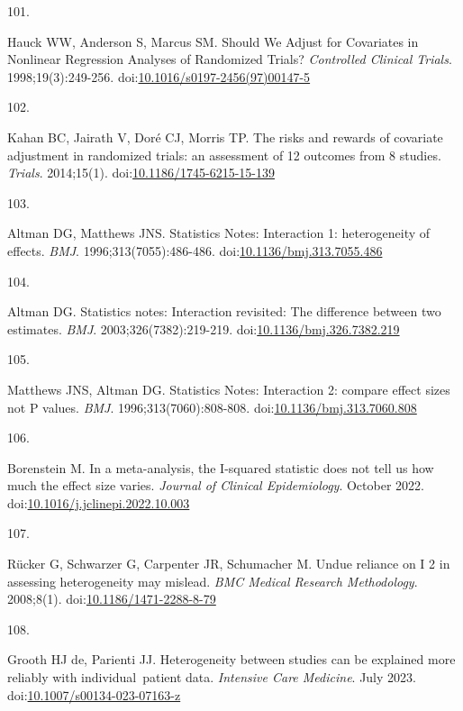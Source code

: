 \documentclass[
]{book}
\newlength{\cslhangindent}
\newlength{\csllabelwidth}
\newlength{\cslentryspacingunit} %
\newenvironment{CSLReferences}[2] %
 {%
  \setlength{\parindent}{0pt}
  \ifodd #1
  \let\oldpar\par
  \def\par{\hangindent=\cslhangindent\oldpar}
  \fi
  \setlength{\parskip}{#2\cslentryspacingunit}
 }%
 {}
\newcommand{\CSLLeftMargin}[1]{\parbox[t]{\csllabelwidth}{#1}}
\newcommand{\CSLRightInline}[1]{\parbox[t]{\linewidth - \csllabelwidth}{#1}\break}
\begin{document}
\begin{CSLReferences}{0}{0}
\leavevmode{}%
\CSLLeftMargin{101. }%
\CSLRightInline{Hauck WW, Anderson S, Marcus SM. Should We Adjust for Covariates in Nonlinear Regression Analyses of Randomized Trials? \emph{Controlled Clinical Trials}. 1998;19(3):249-256. doi:\href{https://doi.org/10.1016/s0197-2456(97)00147-5}{10.1016/s0197-2456(97)00147-5}}

\leavevmode{}%
\CSLLeftMargin{102. }%
\CSLRightInline{Kahan BC, Jairath V, Doré CJ, Morris TP. The risks and rewards of covariate adjustment in randomized trials: an assessment of 12 outcomes from 8 studies. \emph{Trials}. 2014;15(1). doi:\href{https://doi.org/10.1186/1745-6215-15-139}{10.1186/1745-6215-15-139}}

\leavevmode{}%
\CSLLeftMargin{103. }%
\CSLRightInline{Altman DG, Matthews JNS. Statistics Notes: Interaction 1: heterogeneity of effects. \emph{BMJ}. 1996;313(7055):486-486. doi:\href{https://doi.org/10.1136/bmj.313.7055.486}{10.1136/bmj.313.7055.486}}

\leavevmode{}%
\CSLLeftMargin{104. }%
\CSLRightInline{Altman DG. Statistics notes: Interaction revisited: The difference between two estimates. \emph{BMJ}. 2003;326(7382):219-219. doi:\href{https://doi.org/10.1136/bmj.326.7382.219}{10.1136/bmj.326.7382.219}}

\leavevmode{}%
\CSLLeftMargin{105. }%
\CSLRightInline{Matthews JNS, Altman DG. Statistics Notes: Interaction 2: compare effect sizes not P values. \emph{BMJ}. 1996;313(7060):808-808. doi:\href{https://doi.org/10.1136/bmj.313.7060.808}{10.1136/bmj.313.7060.808}}

\leavevmode{}%
\CSLLeftMargin{106. }%
\CSLRightInline{Borenstein M. In a meta-analysis, the I-squared statistic does not tell us how much the effect size varies. \emph{Journal of Clinical Epidemiology}. October 2022. doi:\href{https://doi.org/10.1016/j.jclinepi.2022.10.003}{10.1016/j.jclinepi.2022.10.003}}

\leavevmode{}%
\CSLLeftMargin{107. }%
\CSLRightInline{Rücker G, Schwarzer G, Carpenter JR, Schumacher M. Undue reliance on I 2 in assessing heterogeneity may mislead. \emph{BMC Medical Research Methodology}. 2008;8(1). doi:\href{https://doi.org/10.1186/1471-2288-8-79}{10.1186/1471-2288-8-79}}

\leavevmode{}%
\CSLLeftMargin{108. }%
\CSLRightInline{Grooth HJ de, Parienti JJ. Heterogeneity between studies can be explained more reliably with individual~patient data. \emph{Intensive Care Medicine}. July 2023. doi:\href{https://doi.org/10.1007/s00134-023-07163-z}{10.1007/s00134-023-07163-z}}


\end{CSLReferences}
\end{document}

